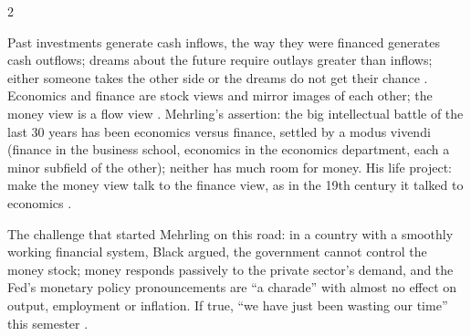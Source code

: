 \begin{paracol}{2}
\begin{nfigure}
\caption{Three views of the same elephant .}\label{fig:tv-views}
\end{nfigure}

Past investments generate cash inflows, the way they were financed generates cash outflows; dreams about the future require outlays greater than inflows; either someone
takes the other side or the dreams do not get their chance . Economics and finance are stock views and mirror images of each other;
the money view is a flow view . Mehrling's assertion: the big intellectual battle of the last 30 years has been economics versus finance,
settled by a modus vivendi (finance in the business school, economics in the economics department, each a minor subfield of the other); neither has much room for money.
His life project: make the money view talk to the finance view, as in the 19th century it talked to economics .

\begin{reading}
The challenge that started Mehrling on this road: in a country with a smoothly working financial system, Black argued, the government cannot control the money stock;
money responds passively to the private sector's demand, and the Fed's monetary policy pronouncements are ``a charade'' with almost no effect on output, employment or
inflation. If true, ``we have just been wasting our time'' this semester .
\end{reading}


\end{paracol}
